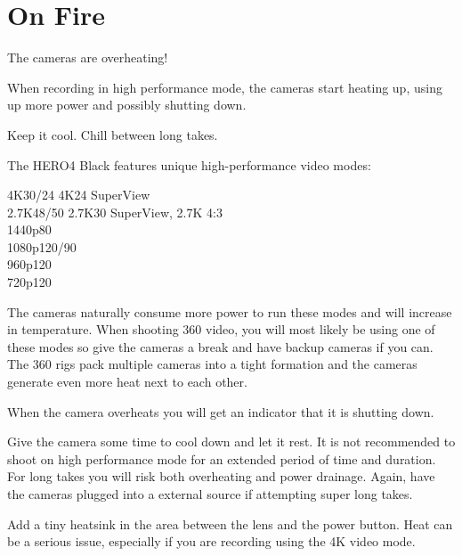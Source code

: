 \chapter{On Fire}
\pagecolor{white}
\label{chap:19}
\begin{fullwidth}


\problem

{\large The cameras are overheating! \par}

When recording in high performance mode, the cameras start heating up, using up more power and possibly shutting down. 


\solution

{\large Keep it cool. Chill between long takes. \par}

The HERO4 Black features unique high-performance video modes: 

4K30/24 4K24 SuperView
\\
2.7K48/50 2.7K30 SuperView, 2.7K 4:3 
\\
1440p80 
\\
1080p120/90 
\\
960p120 
\\
720p120

The cameras naturally consume more power to run these modes and will increase in temperature. When shooting 360 video, you will most likely be using one of these modes so give the cameras a break and have backup cameras if you can. The 360 rigs pack multiple cameras into a tight formation and the cameras generate even more heat next to each other. 

\clearpage
When the camera overheats you will get an indicator that it is shutting down.

                 
Give the camera some time to cool down and let it rest. It is not recommended to shoot on high performance mode for an extended period of time and duration. For long takes you will risk both overheating and power drainage. Again, have the cameras plugged into a \textbf{} external source if attempting super long takes. 

\tip Add a tiny heatsink in the area between the lens and the power button. Heat can be a serious issue, especially if you are recording using the 4K video mode.






\clearpage
\end{fullwidth}
